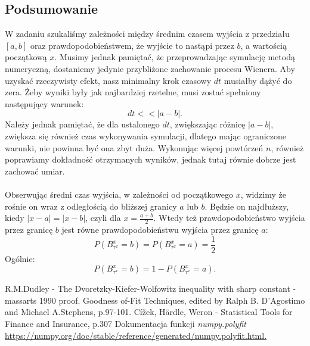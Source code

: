 \documentclass{article}
\theoremstyle{break}
\numberwithin{equation}{subsection}
\numberwithin{figure}{section}
\begin{document}
\subsection*{Podsumowanie}
W zadaniu szukaliśmy zależności między średnim czasem wyjścia z przedziału $[a,b]$ oraz prawdopodobieństwem, że wyjście to nastąpi przez $b$, a wartością początkową $x$. Musimy jednak pamiętać, że przeprowadzając symulację metodą numeryczną, dostaniemy jedynie przybliżone zachowanie procesu Wienera. Aby uzyskać rzeczywisty efekt, nasz minimalny krok czasowy $dt$ musiałby dążyć do zera. Żeby wyniki były jak najbardziej rzetelne, musi zostać spełniony następujący warunek:
 $$dt<<|a-b|.$$ 
Należy jednak pamiętać, że dla ustalonego $dt$, zwiększając różnicę $|a-b|$, zwiększa się również czas wykonywania symulacji, dlatego mając ograniczone warunki, nie powinna być ona zbyt duża. Wykonując więcej powtórzeń $n$, również poprawiamy dokładność otrzymanych wyników, jednak tutaj równie dobrze jest zachować umiar.
\\ \\
Obserwując średni czas wyjścia, w zależności od początkowego $x$, widzimy że rośnie on wraz z odległością do bliższej granicy $a$ lub $b$. Będzie on najdłuższy, kiedy $|x-a|=|x-b|$, czyli dla $x=\frac{a+b}{2}$. Wtedy też prawdopodobieństwo wyjścia przez granicę $b$ jest równe prawdopodobieństwu wyjścia przez granicę $a$:
 $$P(B_{\tau^x}^x=b) = P(B_{\tau^x}^x=a) = \frac{1}{2}$$
Ogólnie:
 $$P(B_{\tau^x}^x=b) = 1 - P(B_{\tau^x}^x=a).$$
\begin{thebibliography}{9}

 R.M.Dudley - The Dvoretzky-Kiefer-Wolfowitz inequality with sharp constant - massarts 1990 proof.
 Goodness of-Fit Techniques, edited by Ralph B. D'Agostimo and Michael A.Stephens, p.97-101.
 Cížek, Härdle, Weron - Statistical Tools for Finance and Insurance, p.307
 Dokumentacja funkcji \emph{numpy.polyfit} \url{https://numpy.org/doc/stable/reference/generated/numpy.polyfit.html.}

\end{thebibliography}
\end{document}
